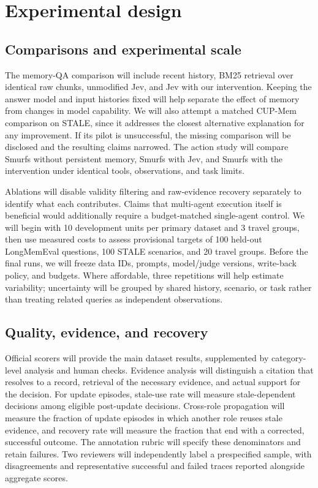 \documentclass[a4paper,11pt]{article}
\begin{document}
\clearpage
\section{Experimental design}
\subsection{Comparisons and experimental scale}
The memory-QA comparison will include recent history, BM25 retrieval over identical raw chunks, unmodified Jev, and Jev with our intervention. Keeping the answer model and input histories fixed will help separate the effect of memory from changes in model capability. We will also attempt a matched CUP-Mem comparison on STALE, since it addresses the closest alternative explanation for any improvement. If its pilot is unsuccessful, the missing comparison will be disclosed and the resulting claims narrowed. The action study will compare Smurfs without persistent memory, Smurfs with Jev, and Smurfs with the intervention under identical tools, observations, and task limits.\par

Ablations will disable validity filtering and raw-evidence recovery separately to identify what each contributes. Claims that multi-agent execution itself is beneficial would additionally require a budget-matched single-agent control. We will begin with 10 development units per primary dataset and 3 travel groups, then use measured costs to assess provisional targets of 100 held-out LongMemEval questions, 100 STALE scenarios, and 20 travel groups. Before the final runs, we will freeze data IDs, prompts, model/judge versions, write-back policy, and budgets. Where affordable, three repetitions will help estimate variability; uncertainty will be grouped by shared history, scenario, or task rather than treating related queries as independent observations.\par

\subsection{Quality, evidence, and recovery}
Official scorers will provide the main dataset results, supplemented by category-level analysis and human checks. Evidence analysis will distinguish a citation that resolves to a record, retrieval of the necessary evidence, and actual support for the decision. For update episodes, stale-use rate will measure stale-dependent decisions among eligible post-update decisions. Cross-role propagation will measure the fraction of update episodes in which another role reuses stale evidence, and recovery rate will measure the fraction that end with a corrected, successful outcome. The annotation rubric will specify these denominators and retain failures. Two reviewers will independently label a prespecified sample, with disagreements and representative successful and failed traces reported alongside aggregate scores.\par
\end{document}
